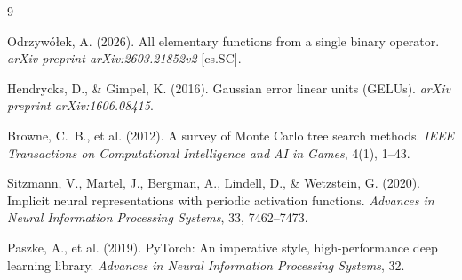 \documentclass[11pt,a4paper]{article}
\begin{document}
\begin{thebibliography}{9}

Odrzyw\'{o}\l{}ek, A. (2026).
All elementary functions from a single binary operator.
\textit{arXiv preprint arXiv:2603.21852v2} [cs.SC].

Hendrycks, D., \& Gimpel, K. (2016).
Gaussian error linear units (GELUs).
\textit{arXiv preprint arXiv:1606.08415}.

Browne, C.~B., et al. (2012).
A survey of Monte Carlo tree search methods.
\textit{IEEE Transactions on Computational Intelligence and AI in Games},
4(1), 1--43.

Sitzmann, V., Martel, J., Bergman, A., Lindell, D., \& Wetzstein, G.
(2020).
Implicit neural representations with periodic activation functions.
\textit{Advances in Neural Information Processing Systems},
33, 7462--7473.

Paszke, A., et al. (2019).
PyTorch: An imperative style, high-performance deep learning library.
\textit{Advances in Neural Information Processing Systems},
32.

\end{thebibliography}
\end{document}
